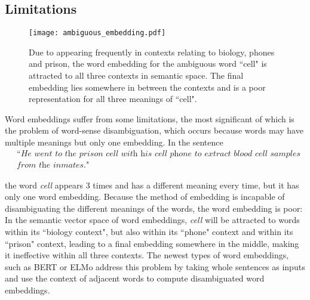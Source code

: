     \subsection{Limitations}
        \begin{figure}[h]
            \centering
            \texttt{[image: ambiguous\_embedding.pdf]}
            \caption{Due to appearing frequently in contexts relating to biology, phones and prison, the word embedding for the ambiguous word ``cell" is attracted to all three contexts in semantic space. The final embedding lies somewhere in between the contexts and is a poor representation for all three meanings of ``cell".}
            \label{fig:ambiguous_embedding}
        \end{figure}
        
        Word embeddings suffer from some limitations, the most significant of which is the problem of word-sense disambiguation, which occurs because words may have multiple meanings but only one embedding. In the sentence
        \begin{align*}
            &\textit{``He went to the prison cell with his cell phone to extract blood cell samples}\\
            & \textit{from the inmates."}
        \end{align*}
        
        the word \textit{cell} appears 3 times and has a different meaning every time, but it has only one word embedding. Because the method of embedding is incapable of disambiguating the different meanings of the words, the word embedding is poor: In the semantic vector space of word embeddings, \textit{cell} will be attracted to words within its ``biology context", but also within its ``phone" context and within its ``prison" context, leading to a final embedding somewhere in the middle, making it ineffective within all three contexts. The newest types of word embeddings, such as BERT\cite{devlin2018bert} or ELMo\cite{peters2018elmo} address this problem by taking whole sentences as inputs and use the context of adjacent words to compute disambiguated word embeddings.